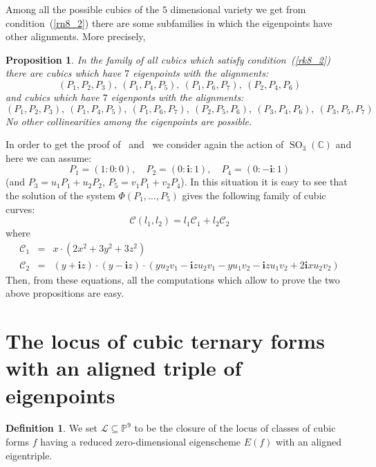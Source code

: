 \documentclass[11pt, a4paper, reqno, captions=tableheading,bibliography=totoc]{scrartcl}
\theoremstyle{plain}
\newtheorem{prop}[lemma]{Proposition}
\theoremstyle{definition}
\newtheorem{definition}[lemma]{Definition}
\newcommand{\C}{\mathbb{C}}
\newcommand{\p}{\mathbb{P}}
\newcommand{\SO}{\operatorname{SO}}
\newcommand{\iii}{\textbf{i}}
\begin{document}
Among all the possible cubics of the $5$ dimensional variety we get from
condition~(\ref{rn8_2}) there are some subfamilies in which the eigenpoints
have other alignments. More precisely,
\begin{prop}
\label{prop:rk8_2B}
In the family of all cubics which satisfy condition~(\ref{rk8_2}) there 
are cubics which have $7$ eigenpoints with the alignments:
\[
(P_1, P_2, P_3),\  (P_1, P_4, P_5),\  (P_1, P_6, P_7),\  (P_2, P_4, P_6)
\]
and cubics which have $7$ eigenponts with the alignments:
\[
(P_1, P_2, P_3),\  (P_1, P_4, P_5), \ (P_1, P_6, P_7),\  (P_2, P_5, P_6),\ 
(P_3, P_4, P_6),\  (P_3, P_5, P_7)
\]
No other collinearities among the eigenpoints are possible.
\end{prop}


In order to get the proof of~ and~
we consider again the action of $\SO_3(\C)$ and here we can assume:
\[
P_1 = (1: 0: 0), \quad P_2 = (0: \iii: 1), \quad P_4 = (0: -\iii: 1)
\]
(and $P_3 = u_1P_1+u_2P_2$, $P_5 = v_1P_1+v_2P_4$). In this situation it
is easy to see that the solution of the system $\Phi(P_1, \dots, P_5)$
gives the following family of cubic curves:
\[
\mathcal{C}(l_1, l_2) = l_1\mathcal{C}_1+l_2\mathcal{C}_2
\]
where
\begin{eqnarray}
  \mathcal{C}_1 & = & x \cdot \left(2x^{2} + 3 y^{2} + 3 z^{2}\right)\\
  \mathcal{C}_2 & = & (y + \iii z) \cdot (y - \iii z)
\cdot (y u_{2} v_{1} - \iii z u_{2} v_{1} - y u_{1} v_{2} - 
\iii z u_{1} v_{2} + 2 \iii x u_{2} v_{2})  \nonumber
\label{famigliaCubDim1}
\end{eqnarray}
Then, from these equations, all the computations which allow to prove
the two above propositions are easy.









\section{The locus of cubic ternary forms with an aligned triple of eigenpoints}
\label{locus_one_alignment}

\begin{definition}
 We set $\mathcal{L} \subseteq \p^9$ to be the closure of the locus of classes of cubic forms $f$ having a reduced zero-dimensional eigenscheme $E(f)$ with an aligned eigentriple.
\end{definition}
\end{document}

